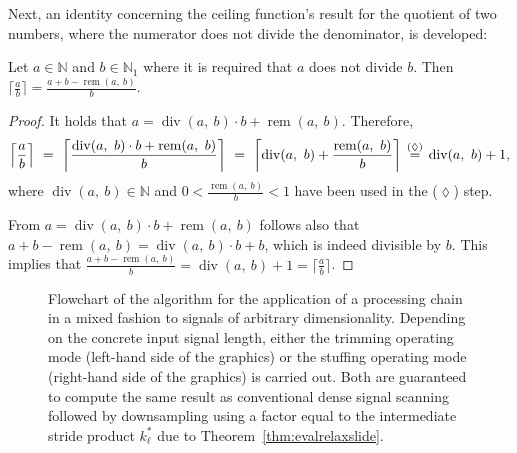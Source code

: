 \documentclass[journal]{IEEEtran}
\newcommand{\N}{\mathbb{N}}
\newcommand{\nceil}[1]{\lceil #1 \rceil}
\renewcommand{\div}[2]{\operatorname{div}(#1,\ #2)}
\newcommand{\rem}[2]{\operatorname{rem}(#1,\ #2)}
\newcommand{\equsing}[1]{\overset{\mathclap{\text{#1}}}{=}}
\begin{document}
Next, an identity concerning the ceiling function's result for the quotient of two numbers, where the numerator does not divide the denominator, is developed:
\begin{lemma}
\label{lem:ceilrem}
Let $a\in\N$ and $b\in\N_1$ where it is required that $a$ does not divide $b$.
Then $\nceil{\frac{a}{b}} = \frac{a + b - \rem{a}{b}}{b}$.
\end{lemma}\begin{proof}
It holds that $a = \div{a}{b}\cdot b + \rem{a}{b}$.
Therefore,
\begin{displaymath}
  \left\lceil \frac{a}{b} \right\rceil
  \ =\ \left\lceil \frac{\div{a}{b}\cdot b + \rem{a}{b}}{b} \right\rceil
  \ =\ \left\lceil \div{a}{b} + \frac{\rem{a}{b}}{b} \right\rceil
  \ \equsing{($\lozenge$)}\ \div{a}{b} + 1\text{,}
\end{displaymath}
where $\div{a}{b}\in\N$ and $0 < \frac{\rem{a}{b}}{b} < 1$ have been used in the ($\lozenge$) step.

From $a = \div{a}{b}\cdot b + \rem{a}{b}$ follows also that $a + b - \rem{a}{b} = \div{a}{b}\cdot b + b$, which is indeed divisible by $b$.
This implies that $\frac{a + b - \rem{a}{b}}{b} = \div{a}{b} + 1 = \nceil{\frac{a}{b}}$.
\end{proof}\begin{figure}[t]
  \centering
  \caption{Flowchart of the algorithm for the application of a processing chain in a mixed fashion to signals of arbitrary dimensionality.
    Depending on the concrete input signal length, either the trimming operating mode (left-hand side of the graphics) or the stuffing operating mode (right-hand side of the graphics) is carried out.
    Both are guaranteed to compute the same result as conventional dense signal scanning followed by downsampling using a factor equal to the intermediate stride product $k_\ell^*$ due to Theorem~\ref{thm:evalrelaxslide}.}
  \label{fig:relaxslide-alg}
\end{figure}
\end{document}
